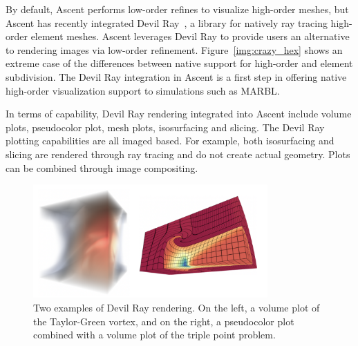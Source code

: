 By default, Ascent performs low-order refines to visualize high-order meshes,
but Ascent has recently integrated Devil Ray~\cite{dray}, a library for natively ray tracing
high-order element meshes.
%
Ascent leverages Devil Ray to provide users an alternative to rendering images via low-order refinement.
%
Figure~\ref{img:crazy_hex} shows an extreme case of the differences between native support for high-order and element subdivision.
%
The Devil Ray integration in Ascent is a first step in offering native high-order
visualization support to simulations such as MARBL.


In terms of capability, Devil Ray rendering integrated into Ascent include
volume plots, pseudocolor plot, mesh plots, isosurfacing and slicing.
%
The Devil Ray plotting capabilities are all imaged based.
%
For example, both isosurfacing and slicing are rendered through ray tracing and do not
create actual geometry.
%
Plots can be combined through image compositing.
%

\begin{figure}
\centering
\includegraphics[width=0.8\textwidth]{images/dray_combined}
\caption{\label{img:dray_plots}
Two examples of Devil Ray rendering. On the left, a volume plot of the
Taylor-Green vortex, and on the right, a pseudocolor plot combined with a
volume plot of the triple point problem.}
\end{figure}
